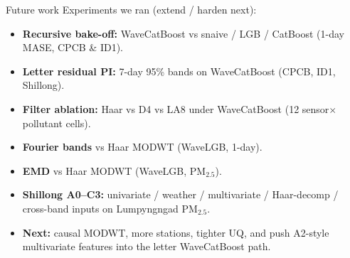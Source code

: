 \begin{frame}{Future work}
  {\footnotesize
  Experiments we ran (extend / harden next):
  }
  \vspace{0.25em}
  {\scriptsize
  \begin{itemize}\setlength\itemsep{0.28em}
    \item \textbf{Recursive bake-off:} WaveCatBoost vs snaive / LGB / CatBoost
          (1-day MASE, CPCB \& ID1).
    \item \textbf{Letter residual PI:} 7-day 95\% bands on WaveCatBoost
          (CPCB, ID1, Shillong).
    \item \textbf{Filter ablation:} Haar vs D4 vs LA8 under WaveCatBoost
          (12 sensor$\times$pollutant cells).
    \item \textbf{Fourier bands} vs Haar MODWT (WaveLGB, 1-day).
    \item \textbf{EMD} vs Haar MODWT (WaveLGB, PM$_{2.5}$).
    \item \textbf{Shillong A0--C3:} univariate / weather / multivariate /
          Haar-decomp / cross-band inputs on Lumpyngngad PM$_{2.5}$.
    \item \textbf{Next:} causal MODWT, more stations, tighter UQ, and push
          A2-style multivariate features into the letter WaveCatBoost path.
  \end{itemize}
  }
\end{frame}
